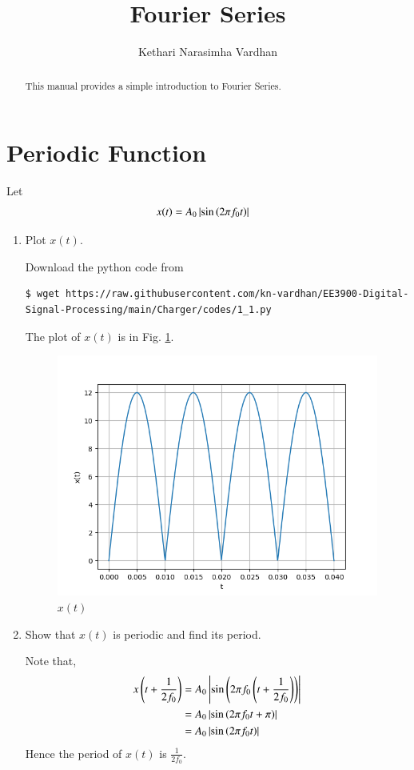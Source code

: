 \documentclass[journal,12pt,twocolumn]{IEEEtran}
\renewcommand\thesection{\arabic{section}}
\begin{document}
\vspace{3cm}
\title{Fourier Series}
\author{Kethari Narasimha Vardhan}
\maketitle
\tableofcontents
\renewcommand{\thefigure}{\theenumi}
\renewcommand{\thetable}{\theenumi}
\bigskip
\begin{abstract}
This manual provides a simple introduction to Fourier Series.
\end{abstract}
\section{Periodic Function}
Let 
\begin{align}
	x(t) &= A_0\left\vert\sin\left(2\pi f_0 t\right)\right\vert
	\label{eq:10-orig-diff-def}
\end{align}
\begin{enumerate}[label=\thesection.\arabic*
,ref=\thesection.\theenumi]
\item Plot $x(t)$.

\solution Download the python code from
\begin{lstlisting}
$ wget https://raw.githubusercontent.com/kn-vardhan/EE3900-Digital-Signal-Processing/main/Charger/codes/1_1.py
\end{lstlisting}
The plot of $x(t)$ is
in Fig. \ref{fig:xt}.
\begin{figure}[!htp]
    \includegraphics[width=\columnwidth]{figs/1_1.png}
    \caption{$x(t)$}
    \label{fig:xt}
\end{figure}
\item Show that $x(t)$ is periodic and find its period.

\solution Note that,
\begin{align}
    x\left(t+\frac{1}{2f_0}\right) &= A_0\left\vert\sin\left(2\pi f_0\left(t + \frac{1}{2f_0}\right)\right)\right\vert \\
                            &= A_0\left\vert\sin\left(2\pi f_0t + \pi\right)\right\vert \\
                            &= A_0\left\vert\sin\left(2\pi f_0t\right)\right\vert
\end{align}
Hence the period of $x(t)$ is $\frac{1}{2f_0}$.
\end{enumerate}
\end{document}
